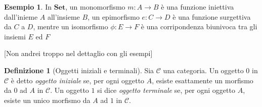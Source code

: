 \documentclass{article}
\theoremstyle{plain}
\theoremstyle{definition}
\newtheorem{definition}[theorem]{Definizione}
\newtheorem{example}[theorem]{Esempio}
\begin{document}
	\begin{example}
		In $\textbf{Set}$, un monomorfismo $m: A \rightarrow B$ è una 
		funzione iniettiva dall'inieme $A$ all'insieme $B$,
		un epimorfismo $e: C \rightarrow D$ è una funzione surgettiva 
		da $C$ a $D$, mentre un isomorfismo $\phi: E \rightarrow F$
		è una corripondenza biunivoca tra gli insiemi $E$ ed $F$
	\end{example}

	[Non andrei troppo nel dettaglio con gli esempi]

	\begin{definition}[Oggetti iniziali e terminali]
		Sia $\mathcal{C}$ una categoria. 
		Un oggetto $0$ in $\mathcal{C}$ è detto \emph{oggetto iniziale} se, 
		per ogni oggetto $A$, esiste esattamente un morfismo da $0$ ad $A$ in $\mathcal{C}$.
		Un oggetto $1$ si dice \emph{oggetto terminale} se, per ogni oggetto $A$, 
		esiste un unico morfismo da $A$ ad $1$ in $\mathcal{C}$.  
	\end{definition}

		
	
\end{document}
